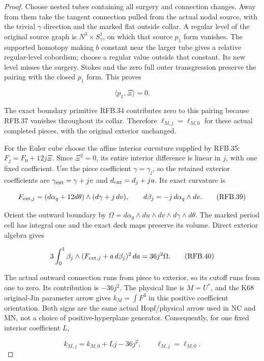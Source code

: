 \begin{proof}
Choose nested tubes containing all surgery and connection changes.
Away from them take the tangent connection pulled from the actual
nodal source, with the trivial \(\gamma\) direction and the marked
flat outside collar. A regular level of the original source graph
is \(N^3\times S^1_\gamma\), on which that source \(p_1\) form
vanishes. The supported homotopy making \(b\) constant near the
larger tube gives a relative regular-level cobordism; choose a
regular value outside that constant. Its new level misses the
surgery. Stokes and the zero full outer transgression preserve the
pairing with the closed \(p_1\) form. This proves

\[
                    \langle p_1,\Xi\rangle=0.
 \tag{RFB.38}
\]

The exact boundary primitive RFB.34 contributes zero to this
pairing because RFB.37 vanishes throughout its collar. Therefore
\(\ell_{M,j}=\ell_{M,0}\) for these actual completed pieces,
with the original exterior unchanged.

For the Euler cube choose the affine interior curvature supplied
by RFB.35: \(F_j=F_0+12j\Xi\). Since \(\Xi^2=0\), its entire
interior difference is linear in \(j\), with one fixed coefficient.
Use the piece coefficient \(\gamma=\gamma_j\), so the retained
exterior coefficients are \(\gamma_{\rm ext}=\gamma+jv\) and
\(d_{\rm ext}=d_j+ju\). Its exact curvature is

\[
 F_{{\rm ext},j}=(d\alpha_q+12d\theta)\wedge(d\gamma+j\,dv),
 \qquad d\beta_j=-j\,d\alpha_q\wedge dv.
 \tag{RFB.39}
\]

Orient the outward boundary by
\(\Omega=d\alpha_q\wedge du\wedge dv\wedge d\gamma\wedge d\theta\).
The marked period cell has integral one and the exact deck maps
preserve its volume. Direct exterior algebra gives

\[
 3\int_0^1\beta_j\wedge(F_{{\rm ext},j}+a\,d\beta_j)^2\,da
                         =36j^2\Omega.
 \tag{RFB.40}
\]

The actual outward connection runs from piece to exterior, so its
cutoff runs from one to zero. Its contribution is \(-36j^2\).
The physical line is \(M=U^*\), and the K68 original-Jin parameter
arrow gives \(k_M=\int F^3\) in this positive coefficient
orientation. Both signs are the same actual Hopf/physical arrow
used in NC and MN, not a choice of positive-hyperplane generator.
Consequently, for one fixed interior coefficient \(L\),

\[
       k_{M,j}=k_{M,0}+Lj-36j^2,
       \qquad\ell_{M,j}=\ell_{M,0}.
 \tag{RFB.41}
\]


\end{proof}
